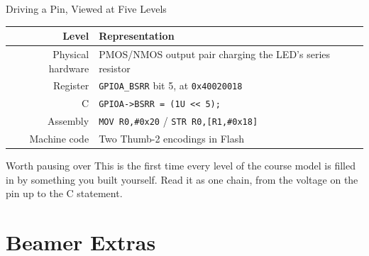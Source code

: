 \documentclass[9pt,aspectratio=169,xcolor=table]{beamer}
\begin{document}
\begin{frame}{Driving a Pin, Viewed at Five Levels}
    \begin{center}
    {\small
    \striped
    \begin{tabular}{@{}r R{.62\textwidth}@{}}
        \toprule
        \textbf{Level} & \textbf{Representation} \\
        \midrule
        Physical hardware & PMOS/NMOS output pair charging the LED's series resistor \\
        Register & \texttt{GPIOA\_BSRR} bit 5, at \texttt{0x40020018} \\
        C & \texttt{GPIOA->BSRR = (1U << 5);} \\
        Assembly & \texttt{MOV R0,\#0x20} / \texttt{STR R0,[R1,\#0x18]} \\
        Machine code & Two Thumb-2 encodings in Flash \\
        \bottomrule
    \end{tabular}}
    \end{center}

    \vspace{3mm}
    \begin{block}{Worth pausing over}
        This is the first time \alert{every level} of the course model is filled in by something you built yourself. Read it as one chain, from the voltage on the pin up to the C statement.
    \end{block}
\end{frame}


\section{Beamer Extras}

%
%
\end{document}
